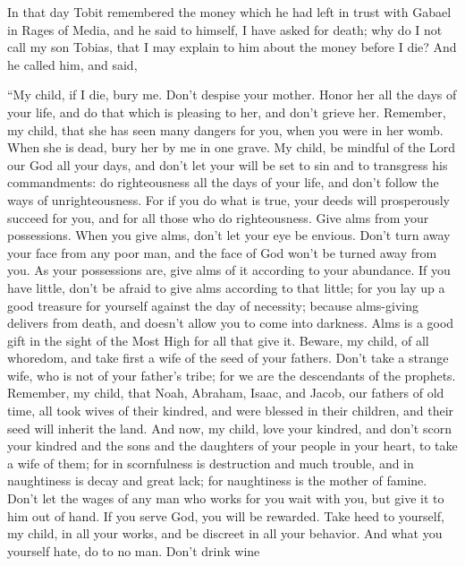  In that day Tobit remembered the money which he had left in
trust with Gabael in Rages of Media,  and he said to
himself, I have asked for death; why do I not call my son Tobias, that I
may explain to him about the money before I die?  And he
called him, and said,

``My child, if I die, bury me. Don't despise your mother. Honor her all
the days of your life, and do that which is pleasing to her, and don't
grieve her.  Remember, my child, that she has seen many
dangers for you, when you were in her womb. When she is dead, bury her
by me in one grave.  My child, be mindful of the Lord our
God all your days, and don't let your will be set to sin and to
transgress his commandments: do righteousness all the days of your life,
and don't follow the ways of unrighteousness.  For if you do
what is true, your deeds will prosperously succeed for you, and for all
those who do righteousness.  Give alms from your
possessions. When you give alms, don't let your eye be envious. Don't
turn away your face from any poor man, and the face of God won't be
turned away from you.  As your possessions are, give alms of
it according to your abundance. If you have little, don't be afraid to
give alms according to that little;  for you lay up a good
treasure for yourself against the day of necessity; 
because alms-giving delivers from death, and doesn't allow you to come
into darkness.  Alms is a good gift in the sight of the
Most High for all that give it.  Beware, my child, of all
whoredom, and take first a wife of the seed of your fathers. Don't take
a strange wife, who is not of your father's tribe; for we are the
descendants of the prophets. Remember, my child, that Noah, Abraham,
Isaac, and Jacob, our fathers of old time, all took wives of their
kindred, and were blessed in their children, and their seed will inherit
the land.  And now, my child, love your kindred, and don't
scorn your kindred and the sons and the daughters of your people in your
heart, to take a wife of them; for in scornfulness is destruction and
much trouble, and in naughtiness is decay and great lack; for
naughtiness is the mother of famine.  Don't let the wages
of any man who works for you wait with you, but give it to him out of
hand. If you serve God, you will be rewarded. Take heed to yourself, my
child, in all your works, and be discreet in all your behavior.
 And what you yourself hate, do to no man. Don't drink wine
